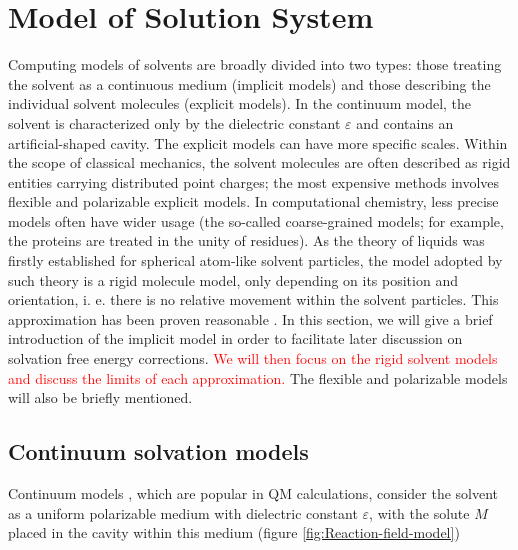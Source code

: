 
\chapter{Model of Solution System\label{chpt:models}}

Computing models of solvents are broadly divided into two types: those
treating the solvent as a continuous medium (implicit models) and
those describing the individual solvent molecules (explicit models).
In the continuum model, the solvent is characterized only by the dielectric
constant $\varepsilon$ and contains an artificial-shaped cavity.
The explicit models can have more specific scales. Within the scope
of classical mechanics, the solvent molecules are often described
as rigid entities carrying distributed point charges; the most expensive
methods involves flexible and polarizable explicit models. In computational
chemistry, less precise models often have wider usage (the so-called
coarse-grained models; for example, the proteins are treated in the
unity of residues). As the theory of liquids was firstly established
for spherical atom-like solvent particles, the model adopted by such
theory is a rigid molecule model, only depending on its position and
orientation, i. e. there is no relative movement within the solvent
particles. This approximation has been proven reasonable \citep{Gray-Gubbins}.
In this section, we will give a brief introduction of the implicit
model in order to facilitate later discussion on solvation free energy
corrections. \textcolor{red}{We will then focus on the rigid solvent
models and discuss the limits of each approximation.} The flexible
and polarizable models will also be briefly mentioned.


\section{Continuum solvation models}

Continuum models \citep{Jensen,Cramer_1999,Tomasi_1994_implicit_model},
which are popular in QM calculations, consider the solvent as a uniform
polarizable medium with dielectric constant $\varepsilon$, with the solute $M$ placed in the cavity within this medium (figure
\ref{fig:Reaction-field-model}) 

